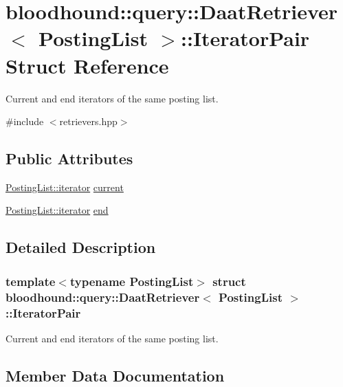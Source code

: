 \hypertarget{structbloodhound_1_1query_1_1DaatRetriever_1_1IteratorPair}{}\section{bloodhound\+:\+:query\+:\+:Daat\+Retriever$<$ Posting\+List $>$\+:\+:Iterator\+Pair Struct Reference}
\label{structbloodhound_1_1query_1_1DaatRetriever_1_1IteratorPair}


Current and end iterators of the same posting list.  




{\ttfamily \#include $<$retrievers.\+hpp$>$}

\subsection*{Public Attributes}
\begin{DoxyCompactItemize}
\item 
\hyperlink{structbloodhound_1_1PostingList_1_1iterator}{Posting\+List\+::iterator} \hyperlink{structbloodhound_1_1query_1_1DaatRetriever_1_1IteratorPair_a39776930389d36b2b0da49c3b5685ec4}{current}
\item 
\hyperlink{structbloodhound_1_1PostingList_1_1iterator}{Posting\+List\+::iterator} \hyperlink{structbloodhound_1_1query_1_1DaatRetriever_1_1IteratorPair_af2205effb4b97e6351c3d32c034342c2}{end}
\end{DoxyCompactItemize}


\subsection{Detailed Description}
\subsubsection*{template$<$typename Posting\+List$>$\newline
struct bloodhound\+::query\+::\+Daat\+Retriever$<$ Posting\+List $>$\+::\+Iterator\+Pair}

Current and end iterators of the same posting list. 

\subsection{Member Data Documentation}
\mbox{\label{structbloodhound_1_1query_1_1DaatRetriever_1_1IteratorPair_a39776930389d36b2b0da49c3b5685ec4}} 
